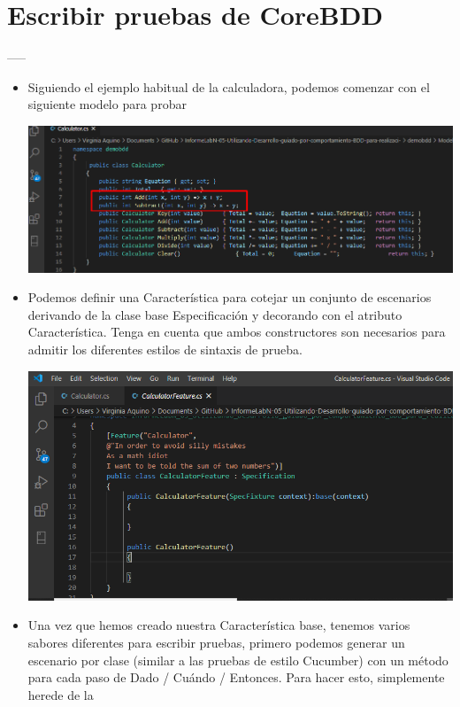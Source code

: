 \section{Escribir pruebas de CoreBDD} 
-----
\begin{itemize}
 \item Siguiendo el ejemplo habitual de la calculadora, podemos comenzar con el siguiente modelo para probar
\begin{center}
\includegraphics[width=\columnwidth]{images/001}\newline
\end{center}
\item Podemos definir una Característica para cotejar un conjunto de escenarios derivando de la clase
base Especificación y decorando con el atributo Característica. Tenga en cuenta que ambos constructores
son necesarios para admitir los diferentes estilos de sintaxis de prueba.
\begin{center}
\includegraphics[width=\columnwidth]{images/002}\newline
\end{center}
\item Una vez que hemos creado nuestra Característica base, tenemos varios sabores diferentes para escribir
pruebas, primero podemos generar un escenario por clase (similar a las pruebas de estilo Cucumber) con
un método para cada paso de Dado / Cuándo / Entonces. Para hacer esto, simplemente herede de la

\end{itemize}
